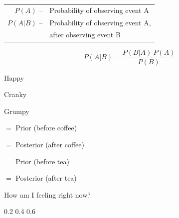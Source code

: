 \documentclass[17pt]{memoir}
\begin{document}
\begin{table}[h]
\centering
  \begin{tabular}{rl}
  $P(A)$ -- & Probability of observing event A \\
  $P(A|B)$ -- & Probability of observing event A, \\
  & after observing event B \\
  \end{tabular}
\end{table}


\Large
\[
P(A|B) = \frac{P(B|A)\: P(A)}{P(B)}
\]

\newpage

Happy

Cranky

Grumpy

$=$ Prior (before coffee)

$=$ Posterior (after coffee)

$=$ Prior (before tea)

$=$ Posterior (after tea)


How am I feeling right now?

0.2   0.4   0.6
\end{document}

